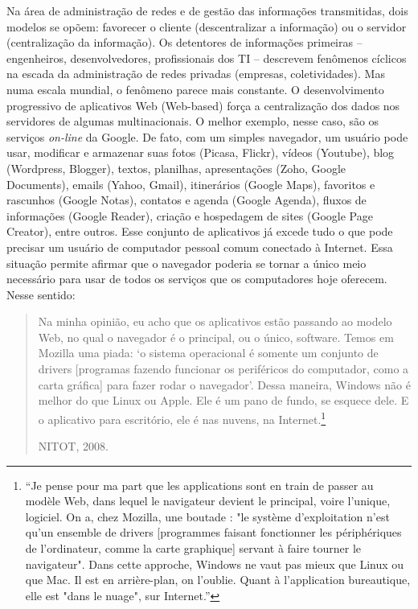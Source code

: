 Na área de administração de redes e de gestão das informações transmitidas, dois modelos se opõem: favorecer o cliente (descentralizar a informação) ou o servidor (centralização da informação). Os detentores de informações primeiras – engenheiros, desenvolvedores, profissionais dos TI – descrevem fenômenos cíclicos na escada da administração de redes privadas (empresas, coletividades). Mas numa escala mundial, o fenômeno parece mais constante. O desenvolvimento progressivo de aplicativos Web (Web-based) força a centralização dos dados nos servidores de algumas multinacionais. O melhor exemplo, nesse caso, são os serviços \emph{on-line} da Google. De fato, com um simples navegador, um usuário pode usar, modificar e armazenar suas fotos (Picasa, Flickr), vídeos (Youtube), blog (Wordpress, Blogger), textos, planilhas, apresentações (Zoho, Google Documents), emails (Yahoo, Gmail), itinerários (Google Maps), favoritos e rascunhos (Google Notas), contatos e agenda (Google Agenda), fluxos de informações (Google Reader), criação e hospedagem de sites (Google Page Creator), entre outros. Esse conjunto de aplicativos já excede tudo o que pode precisar um usuário de computador pessoal comum conectado à Internet. Essa situação permite afirmar que o navegador poderia se tornar a único meio necessário para usar de todos os serviços que os computadores hoje oferecem. Nesse sentido:

\begin{quote}
Na minha opinião, eu acho que os aplicativos estão passando ao modelo Web, no qual o navegador é o principal, ou o único, software. Temos em Mozilla uma piada: ‘o sistema operacional é somente um conjunto de drivers [programas fazendo funcionar os periféricos do computador, como a carta gráfica] para fazer rodar o navegador’. Dessa maneira, Windows não é melhor do que Linux ou Apple. Ele é um pano de fundo, se esquece dele. E o aplicativo para escritório, ele é nas nuvens, na Internet.\footnote{“Je pense pour ma part que les applications sont en train de passer au modèle Web, dans lequel le navigateur devient le principal, voire l'unique, logiciel. On a, chez Mozilla, une boutade : "le système d'exploitation n'est qu'un ensemble de drivers [programmes faisant fonctionner les périphériques de l'ordinateur, comme la carte graphique] servant à faire tourner le navigateur". Dans cette approche, Windows ne vaut pas mieux que Linux ou que Mac. Il est en arrière-plan, on l'oublie. Quant à l'application bureautique, elle est "dans le nuage", sur Internet.”}
\begin{flushright}
NITOT, 2008.
\end{flushright}
\end{quote}

